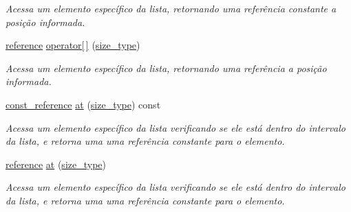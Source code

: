 \begin{DoxyCompactItemize}
\begin{DoxyCompactList}\small\item\em Acessa um elemento específico da lista, retornando uma referência constante a posição informada. \end{DoxyCompactList}\item 
\mbox{\label{classsc_1_1vector_aab84734555f16bbb8a33f5e20257349d}} 
\hyperlink{classsc_1_1vector_a37394c8a6b82c4a0709737d7982e32b2}{reference} \hyperlink{classsc_1_1vector_aab84734555f16bbb8a33f5e20257349d}{operator\mbox{[}$\,$\mbox{]}} (\hyperlink{classsc_1_1vector_a48bf37ba1a6d0c13504414d86e27c399}{size\+\_\+type})
\begin{DoxyCompactList}\small\item\em Acessa um elemento específico da lista, retornando uma referência a posição informada. \end{DoxyCompactList}\item 
\mbox{\label{classsc_1_1vector_aad1a99cfd4cbd7fe58bfb6439d78c8db}} 
\hyperlink{classsc_1_1vector_a8da2b1a11b069241100f9b2e14f481a0}{const\+\_\+reference} \hyperlink{classsc_1_1vector_aad1a99cfd4cbd7fe58bfb6439d78c8db}{at} (\hyperlink{classsc_1_1vector_a48bf37ba1a6d0c13504414d86e27c399}{size\+\_\+type}) const
\begin{DoxyCompactList}\small\item\em Acessa um elemento específico da lista verificando se ele está dentro do intervalo da lista, e retorna uma uma referência constante para o elemento. \end{DoxyCompactList}\item 
\mbox{\label{classsc_1_1vector_ae3f1a60bf1dac7bdf96b78e708d6e2ca}} 
\hyperlink{classsc_1_1vector_a37394c8a6b82c4a0709737d7982e32b2}{reference} \hyperlink{classsc_1_1vector_ae3f1a60bf1dac7bdf96b78e708d6e2ca}{at} (\hyperlink{classsc_1_1vector_a48bf37ba1a6d0c13504414d86e27c399}{size\+\_\+type})
\begin{DoxyCompactList}\small\item\em Acessa um elemento específico da lista verificando se ele está dentro do intervalo da lista, e retorna uma uma referência constante para o elemento. \end{DoxyCompactList}\item 
\mbox{\label{classsc_1_1vector_a8c08600b61d36dd7f76c93f199fbf142}} 

\end{DoxyCompactItemize}
